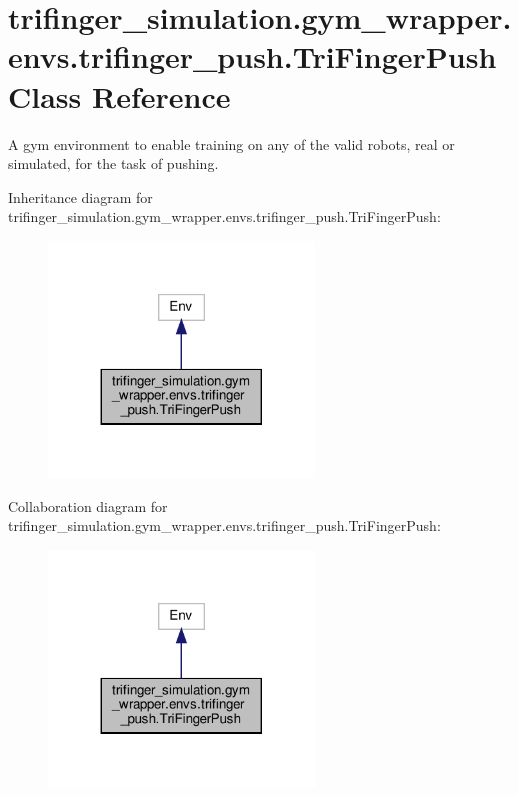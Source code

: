 \hypertarget{classtrifinger__simulation_1_1gym__wrapper_1_1envs_1_1trifinger__push_1_1TriFingerPush}{}\section{trifinger\+\_\+simulation.\+gym\+\_\+wrapper.\+envs.\+trifinger\+\_\+push.\+Tri\+Finger\+Push Class Reference}
\label{classtrifinger__simulation_1_1gym__wrapper_1_1envs_1_1trifinger__push_1_1TriFingerPush}


A gym environment to enable training on any of the valid robots, real or simulated, for the task of pushing.  




Inheritance diagram for trifinger\+\_\+simulation.\+gym\+\_\+wrapper.\+envs.\+trifinger\+\_\+push.\+Tri\+Finger\+Push\+:
\nopagebreak
\begin{figure}[H]
\begin{center}
\leavevmode
\includegraphics[width=200pt]{classtrifinger__simulation_1_1gym__wrapper_1_1envs_1_1trifinger__push_1_1TriFingerPush__inherit__graph}
\end{center}
\end{figure}


Collaboration diagram for trifinger\+\_\+simulation.\+gym\+\_\+wrapper.\+envs.\+trifinger\+\_\+push.\+Tri\+Finger\+Push\+:
\nopagebreak
\begin{figure}[H]
\begin{center}
\leavevmode
\includegraphics[width=200pt]{classtrifinger__simulation_1_1gym__wrapper_1_1envs_1_1trifinger__push_1_1TriFingerPush__coll__graph}
\end{center}
\end{figure}
